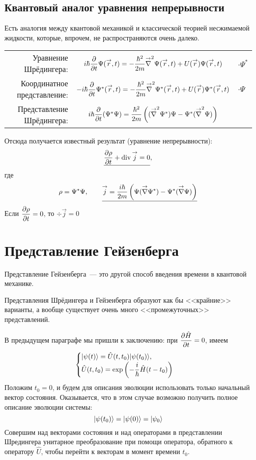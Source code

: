\subsection{Квантовый аналог уравнения непрерывности}
\Rem Есть аналогия между квантовой механикой и классической теорией несжимаемой жидкости, которые, впрочем, не распространяются очень далеко.

\begin{tabular}{r|c|l}
  Уравнение Шрёдингера:  & $
    i \hbar \dfrac{\partial }{\partial t} \Psi (\overset{\to}{r}, t) = - \dfrac{\hbar^2}{2m} \overset{\to}{\nabla}^2 \Psi(\overset{\to}{r}, t) + U(\overset{\to}{r}) \Psi(\overset{\to}{r}, t)
$ & $\cdot \Psi^\ast$ \\[10pt]
  Координатное представление: &
  $
    -i \hbar \dfrac{\partial }{\partial t} \Psi^\ast (\overset{\to}{r}, t) = - \dfrac{\hbar^2}{2m} \overset{\to}{\nabla}^2 \Psi^\ast(\overset{\to}{r}, t) + U(\overset{\to}{r}) \Psi^\ast(\overset{\to}{r}, t)
$
   & $\cdot \Psi$ \\[10pt]
  Представление Шрёдингера: &
  $i\hbar \dfrac{\partial }{\partial t} (\Psi^\ast \Psi) = \dfrac{\hbar^2}{2m} \left(
        (\overset{\to}{\nabla}^2 \Psi^\ast)\Psi - \Psi^\ast(\overset{\to}{\nabla}^2 \Psi)
   \right)$
   &  \\
\end{tabular}

Отсюда получается известный результат (уравнение непрерывности):
$$
        \underline{\dfrac{\partial \rho}{\partial t} + \mathrm{div} \, \overset{\to}{j} = 0},
$$
где
$$
    \rho = \Psi^\ast \Psi, \qquad \underline{\vec j = \dfrac{i \hbar}{2m} \left(
        \Psi(\vec \nabla \Psi^\ast) - \Psi^\ast(\vec \nabla \Psi)
    \right)}\index{Уравнение непрерывности}
$$
Если $\dfrac{\partial \rho}{\partial t} = 0$, то $\div \vec j = 0$

\section{Представление Гейзенберга}
Представление Гейзенберга~--- это другой способ введения времени в квантовой механике.

\Rem Представления Шрёдингера и Гейзенберга образуют как бы <<крайние>> варианты, а вообще существует очень много <<промежуточных>> представлений.

В предыдущем параграфе мы пришли к заключению: при $\dfrac{\partial \Hat H}{\partial t} = 0$, имеем
$$
    \begin{cases}
    | \psi(t) \rangle = \hat U (t, t_0) | \psi(t_0) \rangle,\\
    \Hat U(t, t_0)  = \exp \left( -\dfrac{i}{\hbar}\Hat H (t-t_0) \right)
    \end{cases}
$$
Положим $t_0 = 0$, и будем для описания эволюции использовать только начальный вектор состояния. Оказывается, что в этом случае возможно получить полное описание эволюции системы:
$$
    | \psi(t_0) \rangle=| \psi(0) \rangle = | \psi_0 \rangle
$$
Совершим над векторами состояния и над операторами в представлении Шредингера унитарное преобразование при помощи оператора, обратного к оператору $\hat U$, чтобы перейти к векторам в момент времени $t_0$.

